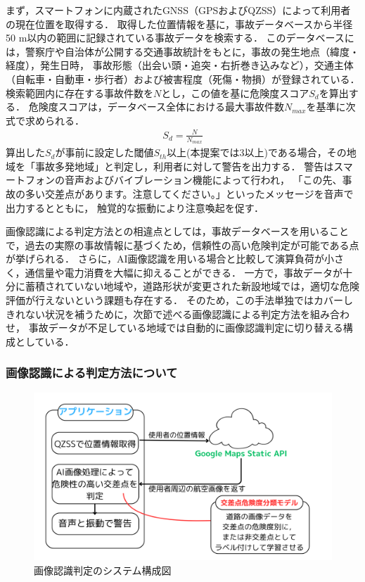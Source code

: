 \documentclass[uplatex,dvipdfmx]{jsarticle}
\begin{document}
まず，スマートフォンに内蔵されたGNSS（GPSおよびQZSS）によって利用者の現在位置を取得する．
取得した位置情報を基に，事故データベースから半径50 m以内の範囲に記録されている事故データを検索する．
このデータベースには，警察庁や自治体が公開する交通事故統計をもとに，事故の発生地点（緯度・経度），発生日時，
事故形態（出会い頭・追突・右折巻き込みなど），交通主体（自転車・自動車・歩行者）および被害程度（死傷・物損）が登録されている．
検索範囲内に存在する事故件数を$N$とし，この値を基に危険度スコア$S_d$を算出する．
危険度スコアは，データベース全体における最大事故件数$N_{max}$を基準に次式で求められる．
\begin{align}
  S_d = \frac{N}{N_{max}}
\end{align}
算出した$S_d$が事前に設定した閾値$S_{th}$以上(本提案では3以上)である場合，その地域を「事故多発地域」と判定し，利用者に対して警告を出力する．
警告はスマートフォンの音声およびバイブレーション機能によって行われ，
「この先、事故の多い交差点があります。注意してください。」といったメッセージを音声で出力するとともに，
触覚的な振動により注意喚起を促す．

画像認識による判定方法との相違点としては，事故データベースを用いることで，過去の実際の事故情報に基づくため，信頼性の高い危険判定が可能である点が挙げられる．
さらに，AI画像認識を用いる場合と比較して演算負荷が小さく，通信量や電力消費を大幅に抑えることができる．
一方で，事故データが十分に蓄積されていない地域や，道路形状が変更された新設地域では，適切な危険評価が行えないという課題も存在する．
そのため，この手法単独ではカバーしきれない状況を補うために，次節で述べる画像認識による判定方法を組み合わせ，
事故データが不足している地域では自動的に画像認識判定に切り替える構成としている．

\subsubsection{画像認識による判定方法について}
\begin{figure}[H]
  \centering
  \includegraphics[width=14cm]{./Figs/system_new.png}
  \caption{画像認識判定のシステム構成図}
  \label{fig:system_new}
\end{figure}
\end{document}
